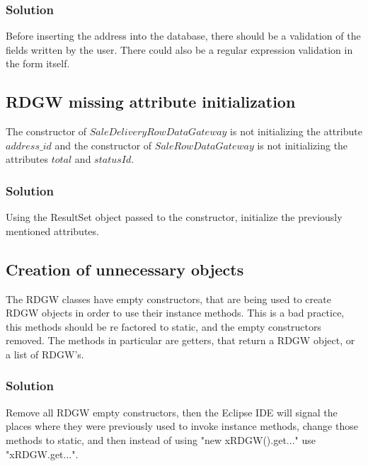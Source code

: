 \documentclass[12pt]{article}
\begin{document}
\subsubsection{Solution}
Before inserting the address into the database, there should be a validation of the fields written by the user. There could also be a regular expression validation in the form itself.
\newpage
\subsection{RDGW missing attribute initialization}
The constructor of $SaleDeliveryRowDataGateway$ is not initializing the attribute $address\_id$ and the constructor of $SaleRowDataGateway$ is not initializing the attributes $total$ and $statusId$. 


\subsubsection{Solution}
Using the ResultSet object passed to the constructor, initialize the previously mentioned attributes.
\subsection{Creation of unnecessary objects}
The RDGW classes have empty constructors, that are being used to create RDGW objects in order to use their instance methods. This is a bad practice, this methods should be re factored to static, and the empty constructors removed. The methods in particular are getters, that return a RDGW object, or a list of RDGW's. 


\subsubsection{Solution}
Remove all RDGW empty constructors, then the Eclipse IDE will signal the places where they were previously used to invoke instance methods, change those methods to static, and then instead of using "new xRDGW().get..." use "xRDGW.get...".





\end{document}
